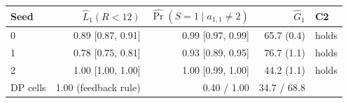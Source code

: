 \begin{tabular}{lrrrl}
\toprule
Seed & $\hat L_1(R<12)$ & $\widehat{\Pr}(S=1\mid a_{1,1}\ne 2)$ & $\hat G_1$ & C2 \\
\midrule
0 & 0.89 [0.87, 0.91] & 0.99 [0.97, 0.99] & 65.7 (0.4) & holds \\
1 & 0.78 [0.75, 0.81] & 0.93 [0.89, 0.95] & 76.7 (1.1) & holds \\
2 & 1.00 [1.00, 1.00] & 1.00 [0.99, 1.00] & 44.2 (1.1) & holds \\
\midrule
DP cells & 1.00 (feedback rule) & 0.40 / 1.00 & 34.7 / 68.8 & \\
\bottomrule
\end{tabular}
